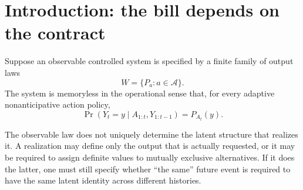 \documentclass[11pt,a4paper]{article}
\newcommand{\cA}{\mathcal A}
\newcommand{\1}{\mathbf 1}
\begin{document}
\begin{abstract}
This yields the compact comparison
\[
\boxed{
C_\infty^{\mathrm{causal}}
=
\max_a \langle \psi_a,L_a\psi_a\rangle,
}
\]
for two actions, while
\[
\boxed{
C_\infty^{\mathrm{syn}}
\ge
\frac12
\left[
\langle L_P\rangle+
\langle L_Q\rangle+
d_{\mathrm{Lip}}(P,Q)
\right],
}
\]
where
\[
d_{\mathrm{Lip}}(P,Q)
=
W_1(\mu_P,\mu_Q).
\]
In this precise sense, the causal contract pays asymptotically for the
largest mean surprisal, whereas stable synchronous identity can retain
a cost determined by the full surprisal spectrum.

Finally, we connect this spectral ledger to a scale-orbit calculation
from compactly supported polynomial kernels.
Unitary dilation produces a Mellin spectral measure, and every such
finite-energy orbit measure defines a valid spectral probe of surprisal
mismatch and hence a synchronous lower-bound certificate.
The hard-edged \(k=0\) kernel is singular and reproduces exactly the
\(\min/\max\) scalar identity underlying the Wasserstein converse.
Smoother kernels define a family of softer spectral auditors.

The resulting framework does not identify an ontology and does not
claim that one physical vector underlies reality.
It gives a unified representation of the accounting problem:
one state vector, an algebra acting on it, and a spectral ledger
recording which distinctions the realization contract is required to
preserve.
\end{abstract}


\section{Introduction: the bill depends on the contract}

Suppose an observable controlled system is specified by a finite family
of output laws
\[
W=\{P_a:a\in\cA\}.
\]
The system is memoryless in the operational sense that, for every
adaptive nonanticipative action policy,
\[
\Pr(Y_t=y\mid A_{1:t},Y_{1:t-1})
=
P_{A_t}(y).
\tag{1.1}
\]

The observable law does not uniquely determine the latent structure that
realizes it.
A realization may define only the output that is actually requested,
or it may be required to assign definite values to mutually exclusive
alternatives.
If it does the latter, one must still specify whether ``the same''
future event is required to have the same latent identity across
different histories.
\end{document}
